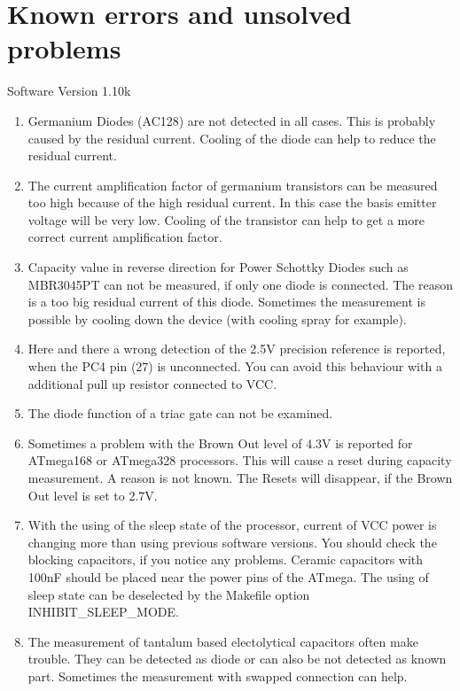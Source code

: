 
\chapter{Known errors and unsolved problems}
{\center Software Version 1.10k}

\begin{enumerate}

\item Germanium Diodes (AC128) are not detected in all cases. This is probably caused by the residual current.
Cooling of the diode can help to reduce the residual current.

\item The current amplification factor of germanium transistors can be measured too high because of
the high residual current. In this case the basis emitter voltage will be very low.
Cooling of the transistor can help to get a more correct current amplification factor.

\item Capacity value in reverse direction for Power Schottky Diodes such as MBR3045PT can not be measured,
if only one diode is connected. The reason is a too big residual current of this diode.
Sometimes the measurement is possible by cooling down the device (with  cooling spray for example).

\item Here and there  a wrong detection of the 2.5V precision reference is reported, when the PC4 pin (27) is unconnected.
You can avoid this behaviour with a additional pull up resistor connected to VCC.

\item The diode function of a triac gate can not be examined.

\item Sometimes a problem with the Brown Out level of 4.3V is reported for ATmega168 or ATmega328 processors.
This will cause a reset during capacity measurement. A reason is not known.
The Resets will disappear, if the Brown Out level is set to 2.7V.

\item With the using of the sleep state of the processor, current of VCC power is changing more than 
using previous software versions.
You should check the blocking capacitors, if you notice any problems.
Ceramic capacitors with 100nF should be placed near the power pins of the ATmega. 
The using of sleep state can be deselected by the Makefile option INHIBIT\_SLEEP\_MODE.

\item The measurement of tantalum based electolytical capacitors often make trouble.
They can be detected as diode or can also be not detected as known part.
Sometimes the measurement with swapped connection can help.

\end{enumerate}
